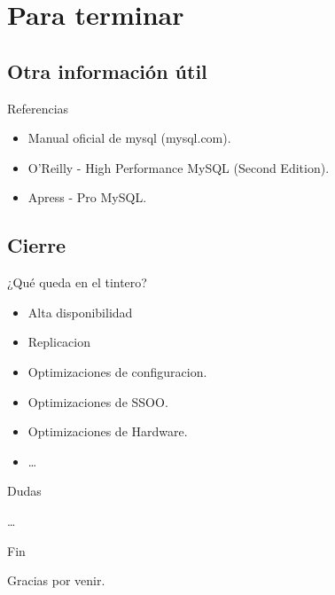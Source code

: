 \section*{Para terminar}
\subsection*{Otra información útil}
\begin{frame}{Referencias}
  \begin{itemize}
    \item Manual oficial de mysql (mysql.com).
    \item O'Reilly - High Performance MySQL (Second Edition).
    \item Apress - Pro MySQL.
  \end{itemize}
\end{frame}

\subsection*{Cierre}

\begin{frame}{¿Qué queda en el tintero?}
  \begin{itemize}
    \item Alta disponibilidad
    \item Replicacion
    \item Optimizaciones de configuracion.
    \item Optimizaciones de SSOO.
    \item Optimizaciones de Hardware.
    \item \dots
  \end{itemize}
\end{frame}

\begin{frame}{Dudas}
  \begin{center}
    \dots
  \end{center}
\end{frame}

\begin{frame}{Fin}
  \begin{center}
    Gracias por venir.
  \end{center}
\end{frame}
